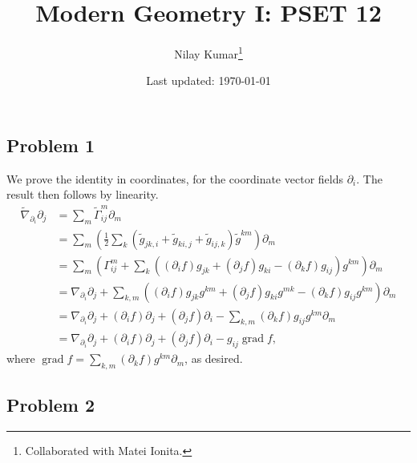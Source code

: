 \documentclass{../mathnotes}
\title{Modern Geometry I: PSET 12}
\author{Nilay Kumar\footnote{Collaborated with Matei Ionita.}}
\date{Last updated: \today}
\DeclareMathOperator{\grad}{grad}
\begin{document}
\maketitle

\subsection*{Problem 1}

We prove the identity in coordinates, for the coordinate
vector fields $\partial_i$. The result then follows by linearity.
\begin{align*}
    \tilde\nabla_{\partial_i}\partial_j &= \sum_m\tilde\Gamma_{ij}^m\partial_m\\
    &= \sum_m\left( \frac{1}{2}\sum_k \left( \tilde g_{jk,i}+\tilde g_{ki,j}+\tilde g_{ij,k} \right)\tilde g^{km}\right)\partial_m\\
    &= \sum_m\left( \Gamma_{ij}^m+\sum_k\left((\partial_if)g_{jk}+(\partial_jf)g_{ki}-(\partial_kf)g_{ij}\right)g^{km} \right)\partial_m\\
    &=\nabla_{\partial_i}\partial_j + \sum_{k,m}\left((\partial_if)g_{jk}g^{km}+(\partial_jf)g_{ki}g^{mk}-(\partial_kf)g_{ij}g^{km}\right)\partial_m\\
    &= \nabla_{\partial_i}\partial_j+(\partial_if)\partial_j+(\partial_jf)\partial_i-\sum_{k,m}(\partial_kf)g_{ij}g^{km}\partial_m\\
    &= \nabla_{\partial_i}\partial_j+(\partial_if)\partial_j+(\partial_jf)\partial_i-g_{ij}\grad f,
\end{align*}
where $\grad f=\sum_{k,m}(\partial_kf)g^{km}\partial_m$, as desired.

\subsection*{Problem 2}
\end{document}
